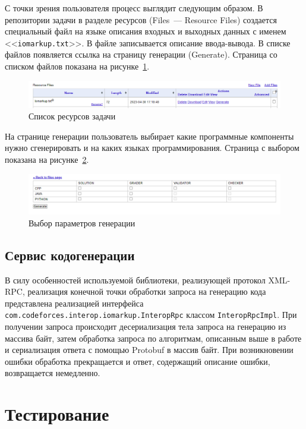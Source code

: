 \documentclass[times,specification,annotation]{style/itmo-student-thesis/itmo-student-thesis}
\begin{document}
С точки зрения пользователя процесс выглядит следующим образом. В репозитории задачи в разделе ресурсов (Files~--- Resource Files) создается специальный файл на языке описания входных и выходных данных с именем <<\texttt{iomarkup.txt}>>. В файле записывается описание ввода-вывода. В списке файлов появляется ссылка на страницу генерации (Generate). Страница со списком файлов показана на рисунке~\ref{resources-screenshot}.

\begin{figure}[!h]
\caption{Список ресурсов задачи}\label{resources-screenshot}
\centering
\includegraphics[scale=0.6]{img/files.png}
\end{figure}

На странице генерации пользователь выбирает какие программные компоненты нужно сгенерировать и на каких языках программирования. Страница с выбором показана на рисунке~\ref{generate-screenshot}.

\begin{figure}[!h]
\caption{Выбор параметров генерации}\label{generate-screenshot}
\centering
\includegraphics[scale=0.6]{img/generate.png}
\end{figure}

\subsection{Сервис кодогенерации}

В силу особенностей используемой библиотеки, реализующей протокол XML-RPC, реализация конечной точки обработки запроса на генерацию кода представлена реализацией интерфейса \texttt{com.codeforces.interop.iomarkup.InteropRpc} классом \texttt{InteropRpcImpl}. При получении запроса происходит десериализация тела запроса на генерацию из массива байт, затем обработка запроса по алгоритмам, описанным выше в работе и сериализация ответа с помощью Protobuf в массив байт. При возникновении ошибки обработка прекращается и ответ, содержащий описание ошибки, возвращается немедленно.

\section{Тестирование}
\end{document}
